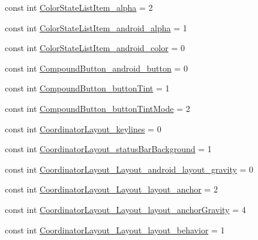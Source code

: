\begin{DoxyCompactItemize}
const int \mbox{\hyperlink{class_f_w_p_s___app_1_1_droid_1_1_resource_1_1_styleable_afee30368b5dea6f193d00c2187c5c236}{Color\+State\+List\+Item\+\_\+alpha}} = 2
\item 
const int \mbox{\hyperlink{class_f_w_p_s___app_1_1_droid_1_1_resource_1_1_styleable_a8b04a49be760f7986457d2e71311ee2d}{Color\+State\+List\+Item\+\_\+android\+\_\+alpha}} = 1
\item 
const int \mbox{\hyperlink{class_f_w_p_s___app_1_1_droid_1_1_resource_1_1_styleable_a4b26f5fd21a44cddfe0ceb0af68e71fd}{Color\+State\+List\+Item\+\_\+android\+\_\+color}} = 0
\item 
const int \mbox{\hyperlink{class_f_w_p_s___app_1_1_droid_1_1_resource_1_1_styleable_a45e3374ab422b1615d4139c7ca4801fe}{Compound\+Button\+\_\+android\+\_\+button}} = 0
\item 
const int \mbox{\hyperlink{class_f_w_p_s___app_1_1_droid_1_1_resource_1_1_styleable_aa25c2e10625f8e45e389b4c1619f581b}{Compound\+Button\+\_\+button\+Tint}} = 1
\item 
const int \mbox{\hyperlink{class_f_w_p_s___app_1_1_droid_1_1_resource_1_1_styleable_a1984c1f3b497bef74bb9fdc2cd3a9276}{Compound\+Button\+\_\+button\+Tint\+Mode}} = 2
\item 
const int \mbox{\hyperlink{class_f_w_p_s___app_1_1_droid_1_1_resource_1_1_styleable_ae91b3a0092f7b74caa47129bb4cdb8c3}{Coordinator\+Layout\+\_\+keylines}} = 0
\item 
const int \mbox{\hyperlink{class_f_w_p_s___app_1_1_droid_1_1_resource_1_1_styleable_ae3ac0078a929a1a1bcc4d23278c52719}{Coordinator\+Layout\+\_\+status\+Bar\+Background}} = 1
\item 
const int \mbox{\hyperlink{class_f_w_p_s___app_1_1_droid_1_1_resource_1_1_styleable_a85c185fcffb73ec9b73834fb40fa3e47}{Coordinator\+Layout\+\_\+\+Layout\+\_\+android\+\_\+layout\+\_\+gravity}} = 0
\item 
const int \mbox{\hyperlink{class_f_w_p_s___app_1_1_droid_1_1_resource_1_1_styleable_a3651567a389748b3e55dbb177879ed78}{Coordinator\+Layout\+\_\+\+Layout\+\_\+layout\+\_\+anchor}} = 2
\item 
const int \mbox{\hyperlink{class_f_w_p_s___app_1_1_droid_1_1_resource_1_1_styleable_a7a72cb09de27912e8eb907df4d1ab77a}{Coordinator\+Layout\+\_\+\+Layout\+\_\+layout\+\_\+anchor\+Gravity}} = 4
\item 
const int \mbox{\hyperlink{class_f_w_p_s___app_1_1_droid_1_1_resource_1_1_styleable_af48b0053c1a191de8aec31f5aa50834c}{Coordinator\+Layout\+\_\+\+Layout\+\_\+layout\+\_\+behavior}} = 1

\end{DoxyCompactItemize}

